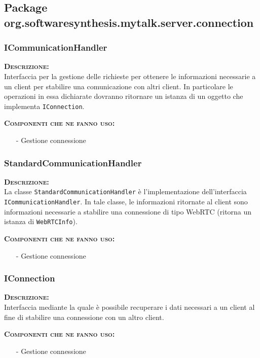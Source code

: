 \subsection{Package org.softwaresynthesis.mytalk.server.connection}

\subsubsection{ICommunicationHandler}
\begin{description}
	\item{\scshape\bfseries Descrizione:}\\
Interfaccia per la gestione delle richieste per ottenere le informazioni necessarie a un client per stabilire una comunicazione con altri client. In particolare le operazioni in essa dichiarate dovranno ritornare un istanza di un oggetto che implementa \texttt{IConnection}.
	\item{\scshape\bfseries Componenti che ne fanno uso:}
		\begin{itemize}[noitemsep,nolistsep]
			\item[-] Gestione connessione
		\end{itemize}
\end{description}

\subsubsection{StandardCommunicationHandler}
\begin{description}
	\item{\scshape\bfseries Descrizione:}\\
La classe \texttt{StandardCommunicationHandler} è l'implementazione dell'interfaccia \texttt{ICommunicationHandler}. In tale classe, le informazioni ritornate al client sono informazioni necessarie a stabilire una connessione di tipo WebRTC (ritorna un istanza di \texttt{WebRTCInfo}).
	\item{\scshape\bfseries Componenti che ne fanno uso:}
		\begin{itemize}[noitemsep,nolistsep]
			\item[-] Gestione connessione
		\end{itemize}
\end{description}

\subsubsection{IConnection}
\begin{description}
	\item{\scshape\bfseries Descrizione:}\\
Interfaccia mediante la quale è possibile recuperare  i dati necessari a un client al fine di stabilire una connessione con un altro client.
	\item{\scshape\bfseries Componenti che ne fanno uso:}
		\begin{itemize}[noitemsep,nolistsep]
			\item[-] Gestione connessione
		\end{itemize}
\end{description}

